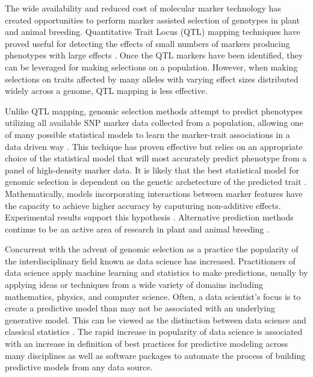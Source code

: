 The wide availability and reduced cost of molecular marker technology
has created opportunities to perform marker assisted selection of genotypes
in plant and animal breeding. Quantitative Trait Locus (QTL) mapping techniques
have proved useful for detecting the effects of small numbers of markers producing 
phenotypes with large effects \citep{miles2008}. Once the QTL 
markers have been identified, they can be leveraged for making selections
on a population. However, when making selections on traits affected by many 
alleles with varying effect sizes distributed widely across a genome, 
QTL mapping is less effective. 

Unlike QTL mapping, genomic selection methods attempt to predict phenotypes 
utilizing all available SNP marker data collected from a population,
allowing one of many possible statistical models to learn the marker-trait 
associations in a data driven way \citep{meuwissen2001}. This techique has
proven effective but relies on an appropriate choice of the statistical 
model that will most accurately predict phenotype from a panel of high-density 
marker data. It is likely that the best statistical model for 
genomic selection is dependent on the genetic archetecture of the 
predicted trait \citep{crossa2010, gonzalez-camacho2012, 
resende2012, cleveland2012, thavamanikumar2015}.  Mathematically, models incorporating 
interactions between marker features have the capacity to achieve higher accuracy 
by caputuring non-additive effects. Experimental results support this 
hypothesis \citep{gonzalez-camacho2012}. Alternative prediction methods continue 
to be an active area of research in plant and animal breeding \citep{koning2012}.

Concurrent with the advent of genomic selection as a practice the popularity of the 
interdisciplinary field known as data science has increased. Practitioners of data 
science apply machine learning and statistics to make predictions, usually
by applying ideas or techniques from a wide variety of domains 
including mathematics, physics, and computer science. Often, a data scientist's focus is to
create a predictive model than may not be associated with an underlying generative model. 
This can be viewed as the distinction between data science and classical statistics 
\citep{donoho2015, breiman2001}. The rapid increase in popularity of data science
is associated with an increase in definition of best practices for predictive modeling
across many disciplines as well as software packages to automate the 
process of building predictive models from any data source.

